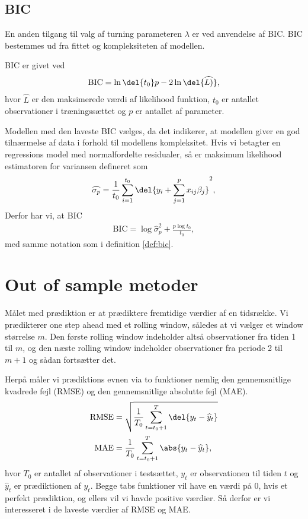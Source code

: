 \subsection{BIC}
En anden tilgang til valg af turning parameteren $\lambda$ er ved anvendelse af BIC.
BIC bestemmes ud fra fittet og kompleksiteten af modellen. 
\begin{defn}\label{def:bic}
BIC er givet ved
\begin{align*}
\text{BIC} = \ln\del{t_0}p - 2 \ln\del{\widehat{L)}}, 
\end{align*}
hvor $\widehat{L}$ er den maksimerede værdi af likelihood funktion, $t_0$ er antallet observationer i træningssættet og $p$ er antallet af parameter.
\end{defn} 
Modellen med den laveste BIC vælges, da det indikerer, at modellen giver en god tilnærmelse af data i forhold til modellens kompleksitet. 
Hvis vi betagter en regressions model med normalfordelte residualer, så er maksimum likelihood estimatoren for variansen defineret som
\begin{align*}
\widehat{\sigma_p} = \frac{1}{t_0} \sum_{i=1}^{t_0} \del{y_i + \sum_{j=1}^p x_{ij}\beta_j}^2,
\end{align*}
Derfor har vi, at BIC 
\begin{align*}
\text{BIC} = \log \widehat{\sigma}^2_p + \frac{p \log t_0}{t_0},
\end{align*}
med samme notation som i definition  \ref{def:bic}.

\section{Out of sample metoder}
Målet med prædiktion er at prædiktere fremtidige værdier af en tidsrække. 
Vi prædikterer one step ahead med et rolling window, således at vi vælger et window størrelse $m$. 
Den første rolling window indeholder altså observationer fra tiden 1 til $m$, og den næste rolling window indeholder observationer fra periode 2 til $m+1$ og sådan fortsætter det. 

Herpå måler vi prædiktions evnen via to funktioner nemlig den gennemsnitlige kvadrede fejl (RMSE) og den gennemsnitlige absolutte fejl (MAE).  
\begin{align}
\text{RMSE} & = \sqrt{\frac{1}{T_0} \sum_{t=t_0 +1 }^{T} \del{y_t - \widehat{y}_t}} \\
\text{MAE} & = \frac{1}{T_0} \sum_{t=t_0 + 1}^{T} \abs{y_t - \widehat{y}_t}, 
\end{align} 
hvor $T_0$ er antallet af observationer i testsættet, $y_t$ er observationen til tiden $t$ og $\widehat{y}_t$ er prædiktionen af $y_t$.
Begge tabs funktioner vil have en værdi på 0, hvis et perfekt prædiktion, og ellers vil vi havde positive værdier. Så derfor er vi interesseret i de laveste værdier af RMSE og MAE. 

